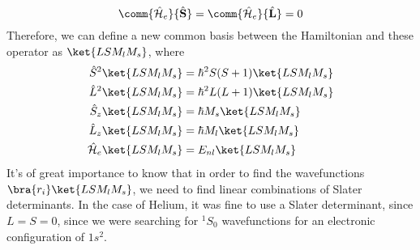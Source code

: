 \documentclass[a4paper, 11pt]{book}
\renewcommand{\vec}[1]{\mathbf{#1}}
\newcommand{\1}{\opr{\mathds{1}}}
\newcommand{\ham}{\mathcal{H}}
\newcommand{\opr}[1]{\hat{#1}}
\newcommand{\vecopr}[1]{\opr{\vec{#1}}}
\theoremstyle{plain}
\begin{document}
	\begin{equation}
		\comm{\opr{\ham}_e}{\vecopr{S}}=\comm{\opr{\ham}_e}{\vecopr{L}}=0
		\label{eq:totaangularmommanyelec}
	\end{equation}
	Therefore, we can define a new common basis between the Hamiltonian and these operator as $\ket{LSM_lM_s}$, where
	\begin{equation}
		\begin{aligned}
			\opr{S}^2\ket{LSM_lM_s}&=\hbar^2S(S+1)\ket{LSM_lM_s}\\
			\opr{L}^2\ket{LSM_lM_s}&=\hbar^2L(L+1)\ket{LSM_lM_s}\\
			\opr{S}_z\ket{LSM_lM_s}&=\hbar M_s\ket{LSM_lM_s}\\
			\opr{L}_z\ket{LSM_lM_s}&=\hbar M_l\ket{LSM_lM_s}\\
			\opr{\ham}_e\ket{LSM_lM_s}&=E_{nl}\ket{LSM_lM_s}
		\end{aligned}
		\label{eq:eigenvalueselectronmanyham}
	\end{equation}
	It's of great importance to know that in order to find the wavefunctions $\bra{r_i}\ket{LSM_lM_s}$, we need to find linear combinations of Slater determinants. In the case of Helium, it was fine to use a Slater determinant, since $L=S=0$, since we were searching for $^1S_0$ wavefunctions for an electronic configuration of $1s^2$.
\end{document}
